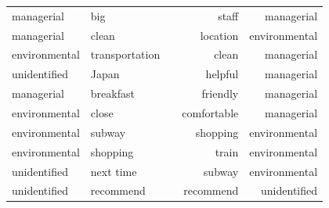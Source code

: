 \documentclass[smallextended,natbib]{svjour3}       %
\providecommand{\DIFaddendFL}{} %
\DeclareRobustCommand{\DIFaddendFL}{\DIFOaddendFL \let\includegraphics\DIFOincludegraphics} %
\begin{document}
\begin{table}[h]
{\begin{tabular}{|l|l|l|r|r|}
managerial & big &  & staff & managerial \\ \cline{1-2} \cline{4-5} 
managerial & clean &  & location & environmental \\ \cline{1-2} \cline{4-5} 
environmental & transportation &  & clean & managerial \\ \cline{1-2} \cline{4-5} 
unidentified & Japan &  & helpful & managerial \\ \cline{1-2} \cline{4-5} 
managerial & breakfast &  & friendly & managerial \\ \cline{1-2} \cline{4-5} 
environmental & close &  & comfortable & managerial \\ \cline{1-2} \cline{4-5} 
environmental & subway &  & shopping & environmental \\ \cline{1-2} \cline{4-5} 
environmental & shopping &  & train & environmental \\ \cline{1-2} \cline{4-5} 
unidentified & next time &  & subway & environmental \\ \cline{1-2} \cline{4-5} 
unidentified & recommend &  & recommend & unidentified \\ \cline{1-2} \cline{4-5} 
\end{tabular}%
}
\DIFaddendFL \end{table}
\end{document}
